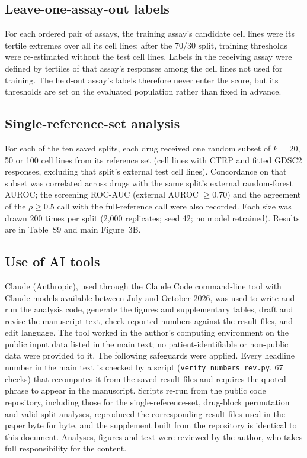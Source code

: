 \subsection*{Leave-one-assay-out labels}
For each ordered pair of assays, the training assay's candidate cell lines were its
tertile extremes over all its cell lines; after the 70/30 split, training thresholds
were re-estimated without the test cell lines. Labels in the receiving assay were
defined by tertiles of that assay's responses among the cell lines not used for
training. The held-out assay's labels therefore never enter the score, but its
thresholds are set on the evaluated population rather than fixed in advance.

\subsection*{Single-reference-set analysis}
For each of the ten saved splits, each drug received one random subset of $k$ = 20,
50 or 100 cell lines from its reference set (cell lines with CTRP and fitted GDSC2
responses, excluding that split's external test cell lines). Concordance on that
subset was correlated across drugs with the same split's external random-forest
AUROC; the screening ROC-AUC (external AUROC $\geq 0.70$) and the agreement of the
$\rho \geq 0.5$ call with the full-reference call were also recorded. Each size was
drawn 200 times per split (2{,}000 replicates; seed 42; no model retrained).
Results are in Table~S9 and main Figure~3B.

\subsection*{Use of AI tools}
Claude (Anthropic), used through the Claude Code command-line tool with Claude
models available between July and October 2026, was used to write and run the
analysis code, generate the figures and supplementary tables, draft and revise the
manuscript text, check reported numbers against the result files, and edit
language. The tool worked in the author's computing environment on the public input
data listed in the main text; no patient-identifiable or non-public data were
provided to it. The following safeguards were applied. Every headline number in the
main text is checked by a script (\texttt{verify\_numbers\_rev.py}, 67 checks)
that recomputes it from the saved result files and requires the quoted phrase to
appear in the manuscript. Scripts re-run from the public code repository, including
those for the single-reference-set, drug-block permutation and valid-split analyses,
reproduced the corresponding result files used in the paper byte for byte, and the
supplement built from the repository is identical to this document. Analyses,
figures and text were reviewed by the author, who takes full responsibility for the
content.

